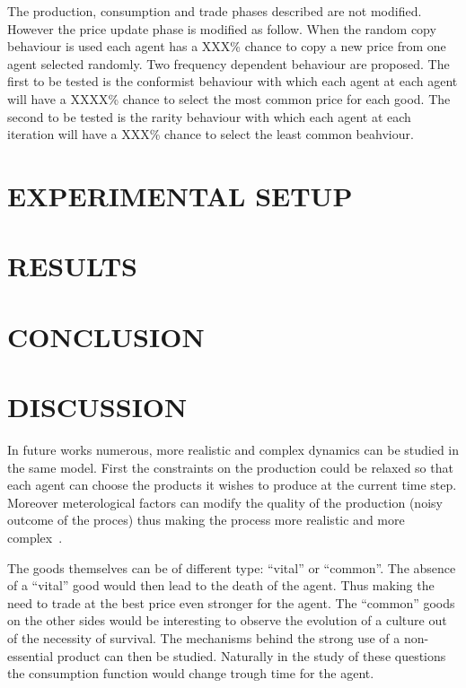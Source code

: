 \documentclass{wscpaperproc}
\begin{document}
The production, consumption and trade phases described are not modified. However the price update phase is modified as follow. When the random copy behaviour is used each agent has a XXX\% chance to copy a new price from one agent selected randomly. Two frequency dependent behaviour are proposed. The first to be tested is the conformist behaviour with which each agent at each agent will have a XXXX\% chance to select the most common price for each good. The second to be tested is the rarity behaviour with which each agent at each iteration will have a XXX\% chance to select the least common beahviour.



\section{EXPERIMENTAL SETUP}

\section{RESULTS}

\section{CONCLUSION}

\section{DISCUSSION}

In future works numerous, more realistic and complex dynamics can be studied in the same model. First the constraints on the production could be relaxed so that each agent can choose the products it wishes to produce at the current time step. Moreover meterological factors can modify the quality of the production (noisy outcome of the proces) thus making the process more realistic and more complex~\cite{bentley_specialisation_2005}.

The goods themselves can be of different type: ``vital'' or ``common''. The absence of a ``vital'' good would then lead to the death of the agent. Thus making the need to trade at the best price even stronger for the agent. The ``common'' goods on the other sides would be interesting to observe the evolution of a culture out of the necessity of survival. The mechanisms behind the strong use of a non-essential product can then be studied. Naturally in the study of these questions the consumption function would change trough time for the agent.
\end{document}

